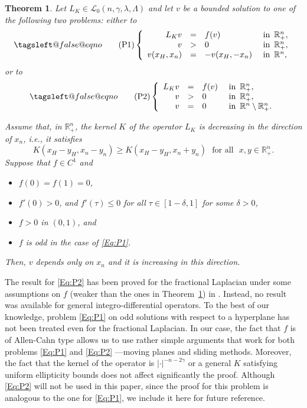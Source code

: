 \documentclass[12pt,reqno]{amsart}
\makeatletter
\newtheorem{theorem}{Theorem}[section]
\theoremstyle{definition}
\theoremstyle{remark}
\newcommand{\con}[1]{\mathbb{#1}}
\newcommand{\R}{\con{R}} %
\newcommand{\lcal}{\mathcal{L}}
\newcommand{\reqnomode}{\tagsleft@false\let\veqno\@@eqno}
\newcommand{\s}{\gamma}
\newcommand\beqc[1]{\left\{\begin{array}{#1}}
\newcommand\eeqc{\end{array} \right.}
\def\PDEsystem{rcll}
\numberwithin{equation}{section}
\makeatother
\begin{document}
\begin{theorem}
	\label{Th:SymmHalfSpace}
	Let $L_K\in \lcal_0(n,\s,\lambda, \Lambda)$ and let $v$ be a bounded solution to one of the following two problems: either to	
	\begin{equation}
	\reqnomode
	\tag{P1}
	\label{Eq:P1}
	\beqc{\PDEsystem}
	L_K v &=& f(v)   &\textrm{ in } \,\R^n_+,\\
	v &>& 0   &\textrm{ in } \,\R^n_+,\\
	v(x_H,x_n) &=& -v(x_H,-x_n)   &\textrm{ in } \,\R^n,
	\eeqc
	\end{equation}
	or to
	\begin{equation}
	\reqnomode
	\tag{P2}
	\label{Eq:P2}
	\beqc{\PDEsystem}
	L_K v &=& f(v)   &\textrm{ in } \,\R^n_+,\\
	v &>& 0   &\textrm{ in } \,\R^n_+,\\
	v &=& 0   &\textrm{ in } \,\R^n \setminus \R^n_+.
	\eeqc
	\end{equation}
	
	\reqnomode
	
	Assume that, in $\R^n_+$, the kernel $K$ of the operator $L_K$ is decreasing in the direction of $x_n$, i.e., it satisfies
	$$
	K(x_H-y_H,x_n-y_n) \geq K(x_H-y_H,x_n+y_n) \,\,\,\,\text{for all } \,\, x,y\in \R^n_+.
	$$ 
	Suppose that $f\in C^1$ and
	\begin{itemize}
		\item $f(0) = f(1) = 0$,
		\item $f'(0)>0$, and $f'(\tau)\leq 0$ for all $\tau\in[1-\delta,1]$ for some $\delta>0$,
		\item $f>0$ in $(0,1)$, and
		\item $f$ is odd in the case of \eqref{Eq:P1}.
	\end{itemize}
	Then, $v$ depends only on $x_n$ and it is increasing in this direction.
\end{theorem}

The result for \eqref{Eq:P2} has been proved for the fractional Laplacian under some assumptions on $f$ (weaker than the ones in Theorem~\ref{Th:SymmHalfSpace}) in \cite{QuaasXia, BarriosEtAl-Monotonicity, BarriosEtAl-Symmetry, FallWethMonotonicity}. Instead, no result was available for general integro-differential operators. To the best of our knowledge, problem \eqref{Eq:P1} on odd solutions with respect to a hyperplane has not been treated even for the fractional Laplacian. In our case, the fact that $f$ is of Allen-Cahn type allows us to use rather simple arguments that work for both problems \eqref{Eq:P1} and \eqref{Eq:P2} ---moving planes and sliding methods. Moreover, the fact that the kernel of the operator is $|\cdot|^{-n-2\s}$ or a general $K$ satisfying uniform ellipticity bounds does not affect significantly the proof.  Although \eqref{Eq:P2} will not be used in this paper, since the proof for this problem is analogous to the one for \eqref{Eq:P1}, we include it here for future reference.
\end{document}
